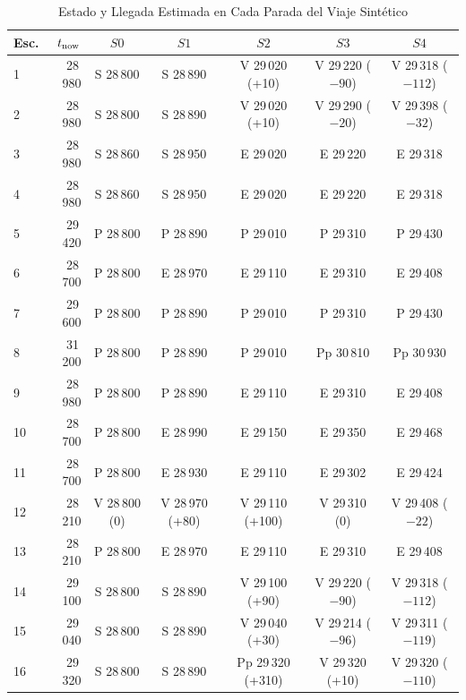 \begin{table}[ht]
\centering
\caption{Estado y Llegada Estimada en Cada Parada del Viaje Sintético}\label{tab:escenarios}
\setlength{\tabcolsep}{3.5pt}
\begin{tabular}{@{}lrccccc@{}}
\toprule
Esc. & $t_{\mathrm{now}}$ & $S0$ & $S1$ & $S2$ & $S3$ & $S4$\\
\midrule
1 & 28\,980 & S 28\,800 & S 28\,890 & V 29\,020 (+10) & V 29\,220 ($-90$) & V 29\,318 ($-112$)\\
2 & 28\,980 & S 28\,800 & S 28\,890 & V 29\,020 (+10) & V 29\,290 ($-20$) & V 29\,398 ($-32$)\\
3 & 28\,980 & S 28\,860 & S 28\,950 & E 29\,020 & E 29\,220 & E 29\,318\\
4 & 28\,980 & S 28\,860 & S 28\,950 & E 29\,020 & E 29\,220 & E 29\,318\\
5 & 29\,420 & P 28\,800 & P 28\,890 & P 29\,010 & P 29\,310 & P 29\,430\\
6 & 28\,700 & P 28\,800 & E 28\,970 & E 29\,110 & E 29\,310 & E 29\,408\\
7 & 29\,600 & P 28\,800 & P 28\,890 & P 29\,010 & P 29\,310 & P 29\,430\\
8 & 31\,200 & P 28\,800 & P 28\,890 & P 29\,010 & Pp 30\,810 & Pp 30\,930\\
9 & 28\,980 & P 28\,800 & P 28\,890 & E 29\,110 & E 29\,310 & E 29\,408\\
10 & 28\,700 & P 28\,800 & E 28\,990 & E 29\,150 & E 29\,350 & E 29\,468\\
11 & 28\,700 & P 28\,800 & E 28\,930 & E 29\,110 & E 29\,302 & E 29\,424\\
12 & 28\,210 & V 28\,800 (0) & V 28\,970 (+80) & V 29\,110 (+100) & V 29\,310 (0) & V 29\,408 ($-22$)\\
13 & 28\,210 & P 28\,800 & E 28\,970 & E 29\,110 & E 29\,310 & E 29\,408\\
14 & 29\,100 & S 28\,800 & S 28\,890 & V 29\,100 (+90) & V 29\,220 ($-90$) & V 29\,318 ($-112$)\\
15 & 29\,040 & S 28\,800 & S 28\,890 & V 29\,040 (+30) & V 29\,214 ($-96$) & V 29\,311 ($-119$)\\
16 & 29\,320 & S 28\,800 & S 28\,890 & Pp 29\,320 (+310) & V 29\,320 (+10) & V 29\,320 ($-110$)\\
\bottomrule
\end{tabular}

\end{table}
